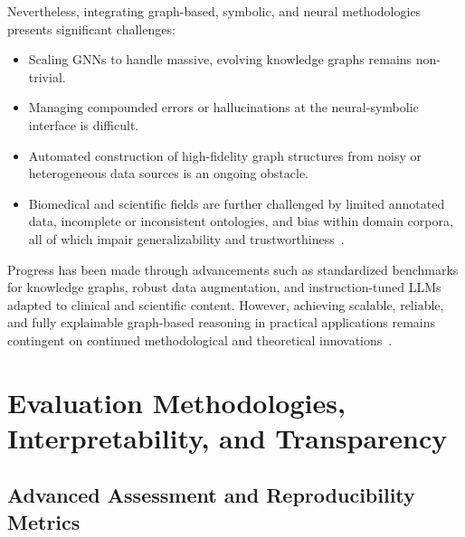 \documentclass[sigconf]{acmart}
\begin{document}
Nevertheless, integrating graph-based, symbolic, and neural methodologies presents significant challenges:
\begin{itemize}
    \item Scaling GNNs to handle massive, evolving knowledge graphs remains non-trivial.
    \item Managing compounded errors or hallucinations at the neural-symbolic interface is difficult.
    \item Automated construction of high-fidelity graph structures from noisy or heterogeneous data sources is an ongoing obstacle.
    \item Biomedical and scientific fields are further challenged by limited annotated data, incomplete or inconsistent ontologies, and bias within domain corpora, all of which impair generalizability and trustworthiness~\cite{ref36,ref43,ref45,ref53,ref55,ref87,ref94}.
\end{itemize}
Progress has been made through advancements such as standardized benchmarks for knowledge graphs, robust data augmentation, and instruction-tuned LLMs adapted to clinical and scientific content. However, achieving scalable, reliable, and fully explainable graph-based reasoning in practical applications remains contingent on continued methodological and theoretical innovations~\cite{ref2,ref3,ref18,ref19,ref36,ref47,ref48,ref49,ref50,ref55,ref61,ref62,ref80,ref87,ref88,ref89,ref94,ref95}.

\section{Evaluation Methodologies, Interpretability, and Transparency}

\subsection{Advanced Assessment and Reproducibility Metrics}
\end{document}
